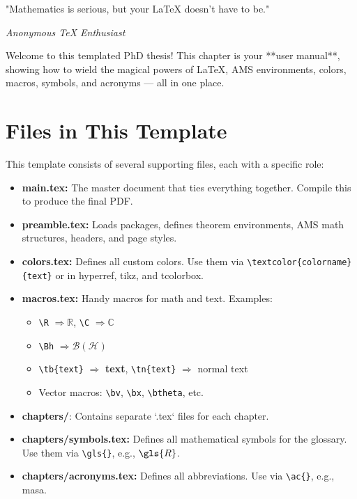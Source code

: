 
\epigraph{"Mathematics is serious, but your LaTeX doesn't have to be."}{\textit{Anonymous TeX Enthusiast}}

Welcome to this templated PhD thesis! This chapter is your **user manual**, showing how to wield the magical powers of LaTeX, AMS environments, colors, macros, symbols, and acronyms — all in one place.

\section{Files in This Template}
This template consists of several supporting files, each with a specific role:

\begin{itemize}
    \item \textbf{main.tex:} The master document that ties everything together. Compile this to produce the final PDF.
    \item \textbf{preamble.tex:} Loads packages, defines theorem environments, AMS math structures, headers, and page styles.
    \item \textbf{colors.tex:} Defines all custom colors. Use them via \verb|\textcolor{colorname}{text}| or in hyperref, tikz, and tcolorbox.
    \item \textbf{macros.tex:} Handy macros for math and text. Examples:
        \begin{itemize}
            \item \verb|\R| $\Rightarrow \mathbb{R}$, \verb|\C| $\Rightarrow \mathbb{C}$
            \item \verb|\Bh| $\Rightarrow \mathcal{B}(\mathcal{H})$
            \item \verb|\tb{text}| $\Rightarrow$ \textbf{text}, \verb|\tn{text}| $\Rightarrow$ normal text
            \item Vector macros: \verb|\bv|, \verb|\bx|, \verb|\btheta|, etc.
        \end{itemize}
    \item \textbf{chapters/}: Contains separate `.tex` files for each chapter.
    \item \textbf{chapters/symbols.tex:} Defines all mathematical symbols for the glossary. Use them via \verb|\gls{}|, e.g., $\gls{R}$.
    \item \textbf{chapters/acronyms.tex:} Defines all abbreviations. Use via \verb|\ac{}|, e.g., \ac{masa}.
\end{itemize}

